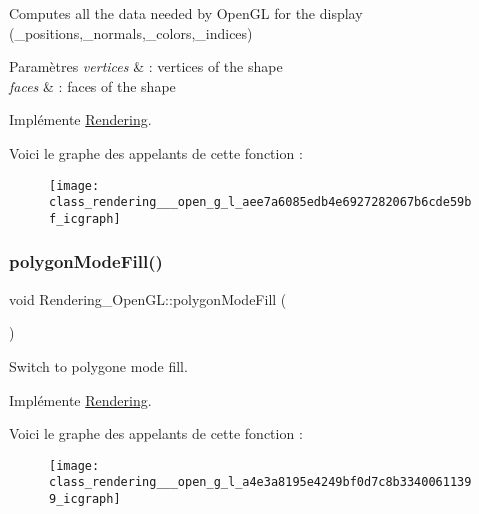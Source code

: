 Computes all the data needed by Open\+GL for the display (\+\_\+positions,\+\_\+normals,\+\_\+colors,\+\_\+indices) 


\begin{DoxyParams}{Paramètres}
{\em vertices} & \+: vertices of the shape \\
\hline
{\em faces} & \+: faces of the shape \\
\hline
\end{DoxyParams}


Implémente \hyperlink{class_rendering_aa753ed0c94b2ece92afd26a58aef4f79}{Rendering}.

Voici le graphe des appelants de cette fonction \+:\nopagebreak
\begin{figure}[H]
\begin{center}
\leavevmode
\texttt{[image: class\_rendering\_\_\_open\_g\_l\_aee7a6085edb4e6927282067b6cde59bf\_icgraph]}
\end{center}
\end{figure}
\mbox{\label{class_rendering___open_g_l_a4e3a8195e4249bf0d7c8b33400611399}} 
\subsubsection{\texorpdfstring{polygon\+Mode\+Fill()}{polygonModeFill()}}
{\footnotesize\ttfamily void Rendering\+\_\+\+Open\+G\+L\+::polygon\+Mode\+Fill (\begin{DoxyParamCaption}{ }\end{DoxyParamCaption})\hspace{0.3cm}{\ttfamily [virtual]}}



Switch to polygone mode fill. 



Implémente \hyperlink{class_rendering_a9ea983c02e590c78d564908d6171335e}{Rendering}.

Voici le graphe des appelants de cette fonction \+:\nopagebreak
\begin{figure}[H]
\begin{center}
\leavevmode
\texttt{[image: class\_rendering\_\_\_open\_g\_l\_a4e3a8195e4249bf0d7c8b33400611399\_icgraph]}
\end{center}
\end{figure}
\mbox{\label{class_rendering___open_g_l_a7742b4b96b3e06a021f143d17fd432df}} 
